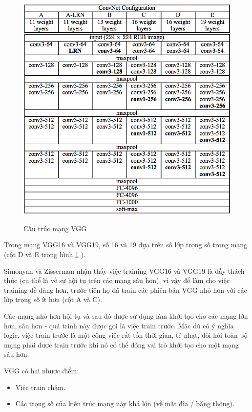 \documentclass[a4paper,14pt]{extreport}
\begin{document}
\begin{figure}  
    \centering
    \includegraphics[scale=0.8]{img/configure.png}
    \caption{Cấu trúc mạng VGG}
    \cite{paper-6}
    \label{fig:vgg-configure}
\end{figure}

Trong mạng VGG16 và VGG19, số 16 và 19 dựa trên số lớp trọng số trong mạng (cột D và E trong hình \ref{fig:vgg-configure} \cite{paper-6}).

Simonyan và Zisserman nhận thấy việc training VGG16 và VGG19 là đầy thách thức (cụ thể là về sự hội tụ trên các mạng sâu hơn), vì vậy để làm cho việc training dễ dàng hơn, trước tiên họ đã train các phiên bản VGG nhỏ hơn với các lớp trọng số ít hơn (cột A và C).

Các mạng nhỏ hơn hội tụ và sau đó được sử dụng làm khởi tạo cho các mạng lớn hơn, sâu hơn - quá trình này được gọi là việc train trước.
Mặc dù có ý nghĩa logic, việc train trước là một công việc rất tốn thời gian, tẻ nhạt, đòi hỏi toàn bộ mạng phải được train trước khi nó có thể đóng vai trò khởi tạo cho một mạng sâu hơn.

VGG có hai nhược điểm:

\begin{itemize}
        \item Việc train chậm.
        \item Các trọng số của kiến trúc mạng này khá lớn (về mặt đĩa / băng thông).
\end{itemize}
\end{document}
